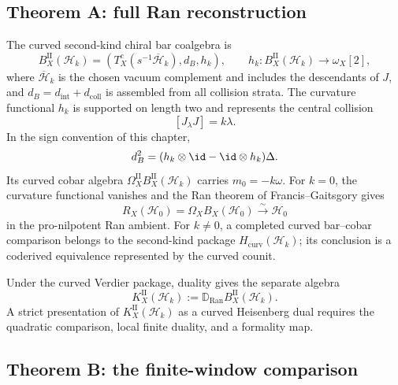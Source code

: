 \documentclass[11pt]{article}
\theoremstyle{plain}
\theoremstyle{definition}
\theoremstyle{remark}
\newcommand{\Ran}{\mathrm{Ran}}
\newcommand{\cH}{\mathcal{H}}
\begin{document}
\subsection{Theorem A: full Ran reconstruction}

The curved second-kind chiral bar coalgebra is
\begin{equation}\label{eq:heis-bar}
 B_X^{\mathrm{II}}(\cH_k)
 =\left(T_X^c(s^{-1}\overline{\cH}_k),
   d_B,h_k\right),
 \qquad
 h_k\colon B_X^{\mathrm{II}}(\cH_k)\longrightarrow\omega_X[2],
\end{equation}
where \(\overline{\cH}_k\) is the chosen vacuum complement and
includes the descendants of \(J\), and
\(d_B=d_{\mathrm{int}}+d_{\mathrm{coll}}\) is assembled from all
collision strata.  The curvature functional \(h_k\) is supported on
length two and represents the central collision
\begin{equation}\label{eq:heis-bar-diff}
 [J_\lambda J]=k\lambda .
\end{equation}
In the sign convention of this chapter,
\[
 d_B^2=(h_k\otimes\id-\id\otimes h_k)\Delta.
\]
Its curved cobar algebra
\(\Omega_X^{\mathrm{II}}B_X^{\mathrm{II}}(\cH_k)\) carries
\(m_0=-k\omega\).  For \(k=0\), the curvature functional vanishes and
the Ran theorem of
Francis--Gaitsgory gives
\[
 R_X(\cH_0)=\Omega_XB_X(\cH_0)\xrightarrow{\sim}\cH_0
\]
in the pro-nilpotent Ran ambient.  For \(k\neq0\), a completed curved
bar--cobar comparison belongs to the second-kind package
\(H_{\mathrm{curv}}(\cH_k)\); its conclusion is a coderived
equivalence represented by the curved counit.

Under the curved Verdier package, duality gives the separate algebra
\begin{equation}\label{eq:heis-dual}
 K_X^{\mathrm{II}}(\cH_k)
 :=\mathbb D_{\Ran}B_X^{\mathrm{II}}(\cH_k).
\end{equation}
A strict presentation of \(K_X^{\mathrm{II}}(\cH_k)\) as a curved Heisenberg dual
requires the quadratic comparison, local finite duality, and a
formality map.

\subsection{Theorem B: the finite-window comparison}
\end{document}

